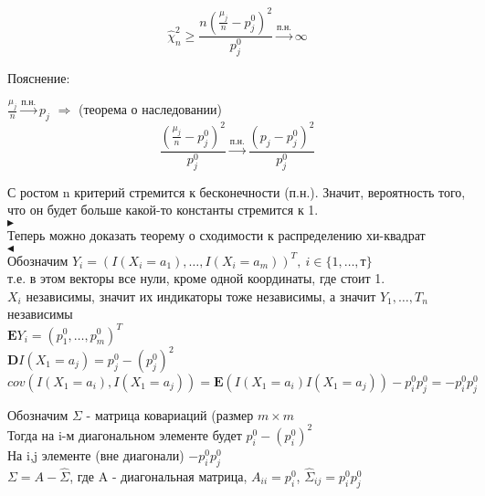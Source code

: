 \documentclass{article}
\begin{document}
$$ \widehat{\chi}^2_n \geq \frac{n\left(\frac{\mu_j}{n} - p_j^0\right)^2}{p_j^0} \xrightarrow{\text{п.н.}} \infty $$

Пояснение:

$\frac{\mu_j}{n}\xrightarrow{\text{п.н.}}p_j$ $\Rightarrow$ (теорема о наследовании)
$$ \frac{\left(\frac{\mu_j}{n} - p_j^0\right)^2}{p_j^0} \xrightarrow{\text{п.н.}} \frac{\left(p_j - p_j^0\right)^2}{p_j^0} $$

С ростом n критерий стремится к бесконечности (п.н.). Значит, вероятность того, что он будет больше какой-то константы стремится к 1.\\

$\blacktriangleright$\\

Теперь можно доказать теорему о сходимости к распределению хи-квадрат\\
$\blacktriangleleft$\\
Обозначим $Y_i = (I(X_i=a_1),\dots,I(X_i=a_m))^T,\ i\in\{1,\dots,т\}$\\
т.е. в этом векторы все нули, кроме одной координаты, где стоит 1.\\
$X_i$ независимы, значит их индикаторы тоже независимы, а значит $Y_1,\dots,T_n$ независимы\\
$\mathbf{E}Y_i = (p_1^0,\dots,p_m^0)^T$\\
$\mathbf{D}I(X_1=a_j) = p_j^0 - (p_j^0)^2$\\
$cov\left(I(X_1=a_i),I(X_1=a_j)\right) = \mathbf{E}(I(X_1 = a_i)I(X_1 = a_j)) - p_i^0p_j^0 = -p_i^0p_j^0 $

Обозначим $\Sigma$ - матрица ковариаций (размер $m\times m$\\
Тогда на i-м диагональном элементе будет $p_i^0 - (p_i^0)^2$\\
На i,j элементе (вне диагонали) $-p_i^0p_j^0$\\

$\Sigma = A - \widehat{\Sigma}$, где A - диагональная матрица, $A_{ii} = p_i^0$, $\widehat{\Sigma}_{ij} = p_i^0p_j^0$\\
\end{document}
